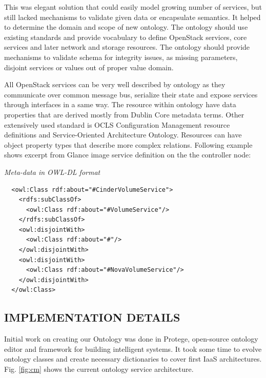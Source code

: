 This was elegant solution that could easily model growing number of services, but still lacked mechanisms to validate given data or encapsulate semantics. It helped to determine the domain and scope of new ontology. The ontology should use existing standards and provide vocabulary to define OpenStack services, core services and later network and storage resources. The ontology should provide mechanisms to validate schema for integrity issues, as missing parameters, disjoint services or values out of proper value domain.


All OpenStack services can be very well described by ontology as they communicate over common message bus, serialize their state and expose services through interfaces in a same way. The resource within ontology have data properties that are derived mostly from Dublin Core metadata terms. Other extensively used standard is OCLS Configuration Management resource definitions and Service-Oriented Architecture Ontology.  Resources can have object property types that describe more complex relations. Following example shows excerpt from Glance image service definition on the the controller node: 

\medskip

\noindent
{\it Meta-data in OWL-DL format}
\begin{verbatim}
  <owl:Class rdf:about="#CinderVolumeService">
    <rdfs:subClassOf>
      <owl:Class rdf:about="#VolumeService"/>
    </rdfs:subClassOf>
    <owl:disjointWith>
      <owl:Class rdf:about="#"/>
    </owl:disjointWith>
    <owl:disjointWith>
      <owl:Class rdf:about="#NovaVolumeService"/>
    </owl:disjointWith>
  </owl:Class>
\end{verbatim}
\noindent

\subsection{IMPLEMENTATION DETAILS}


Initial work on creating our Ontology was done in Protege, open-source ontology editor and framework for building intelligent systems. It took some time to evolve ontology classes and create necessary dictionaries \cite{OntologyEvolution} to cover first IaaS architectures. Fig. \ref{fig:cm} shows the current ontology service architecture.

